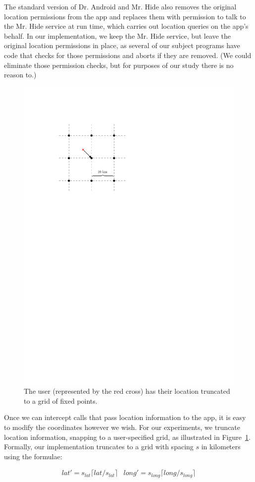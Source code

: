 \documentclass[10pt, conference, compsocconf]{IEEEtran}
\begin{document}
The standard version of Dr. Android and Mr. Hide also removes the
original location permissions from the app and replaces them with
permission to talk to the Mr. Hide service at run time, which carries
out location queries on the app's behalf. In our implementation, we
keep the Mr. Hide service, but leave the original location permissions
in place, as several of our subject programs have code that checks for
those permissions and aborts if they are removed. (We could eliminate
those permission checks, but for purposes of our study there is no
reason to.)

\begin{figure}
  \centering
  \includegraphics[width=.6\columnwidth]{location_grid_truncation_example}
  \caption{The user (represented by the red cross) has their location
    truncated to a grid of fixed points.}
  \label{fig:grid-truncation-example}
\end{figure}

Once we can intercept calls that pass location information to the app,
it is easy to modify the coordinates however we wish. For our
experiments, we truncate location information,
snapping to a user-specified grid, as illustrated in
Figure~\ref{fig:grid-truncation-example}.  Formally, our
implementation truncates to a grid with spacing $s$ in kilometers
using the formulae:

\begin{displaymath}
  \begin{array}{cc}
    \textit{lat}' = s_\textit{lat} \lceil \textit{lat} /s_\textit{lat} \rceil &
    \textit{long}' = s_\textit{long} \lceil \textit{long} /s_\textit{long} \rceil
  \end{array}
\end{displaymath}
\end{document}
